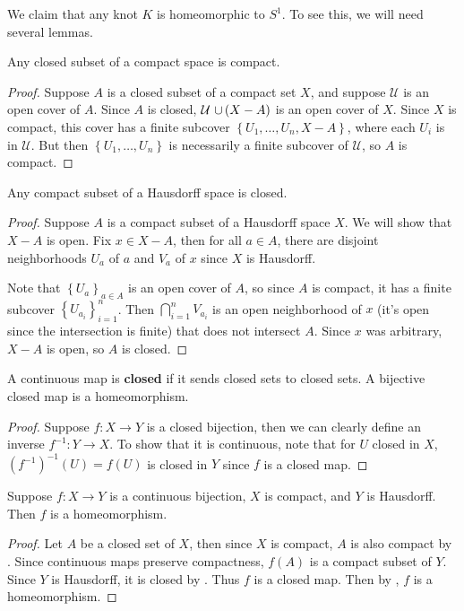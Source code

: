 \documentclass[twoside,10pt]{article}
\begin{document}
We claim that any knot $K$ is homeomorphic to $S^{1}$. To see this, we will need several lemmas.


\begin{lem}
	\label{closed-compact}
Any closed subset of a compact space is compact.
\end{lem}
\begin{proof}
	Suppose $A$ is a closed subset of a compact set $X$, and suppose $\mathcal{U}$ is an open cover of $A$. Since $A$ is closed, $\mathcal{U} \operatorname{\,\cup\,} (X-A)$ is an open cover of $X$. Since $X$ is compact, this cover has a finite subcover $\left\{ U_1, \dots, U_n, X-A \right\}$, where each $U_i$ is in $\mathcal{U}$. But then $\left\{ U_1, \dots, U_n \right\}$ is necessarily a finite subcover of $\mathcal{U}$, so $A$ is compact.
\end{proof}

\begin{lem}
	\label{compact-haus}
Any compact subset of a Hausdorff space is closed.
\end{lem}
\begin{proof}
	Suppose $A$ is a compact subset of a Hausdorff space $X$. We will show that $X-A$ is open. Fix $x \in X-A$, then for all $a \in A$, there are disjoint neighborhoods $U_a$ of $a$ and $V_{a}$ of $x$ since $X$ is Hausdorff.

	Note that $\left\{ U_a \right\}_{a\in A}$ is an open cover of $A$, so since $A$ is compact, it has a finite subcover $\left\{ U_{a_i} \right\}_{i=1}^{n}$. Then $\bigcap_{i=1}^{n}V_{a_i}$ is an open neighborhood of $x$ (it's open since the intersection is finite) that does not intersect $A$. Since $x$ was arbitrary, $X-A$ is open, so $A$ is closed.
\end{proof}

\begin{lem}
	\label{bij-closed-homeo}
A continuous map is \textbf{closed} if it sends closed sets to closed sets. A bijective closed map is a homeomorphism.
\end{lem}
\begin{proof}
	Suppose $f:X\to Y$ is a closed bijection, then we can clearly define an inverse $f^{-1}:Y\to X$. To show that it is continuous, note that for $U$ closed in $X$, $(f^{-1})^{-1}(U) = f(U)$ is closed in $Y$ since $f$ is a closed map.
\end{proof}

\begin{lem}
	\label{compact-haus-homeo}
Suppose $f:X\to Y$ is a continuous bijection, $X$ is compact, and $Y$ is Hausdorff. Then $f$ is a homeomorphism.
\end{lem}
\begin{proof}
	Let $A$ be a closed set of $X$, then since $X$ is compact, $A$ is also compact by . Since continuous maps preserve compactness, $f(A)$ is a compact subset of $Y$. Since $Y$ is Hausdorff, it is closed by . Thus $f$ is a closed map. Then by , $f$ is a homeomorphism.
\end{proof}
\end{document}
